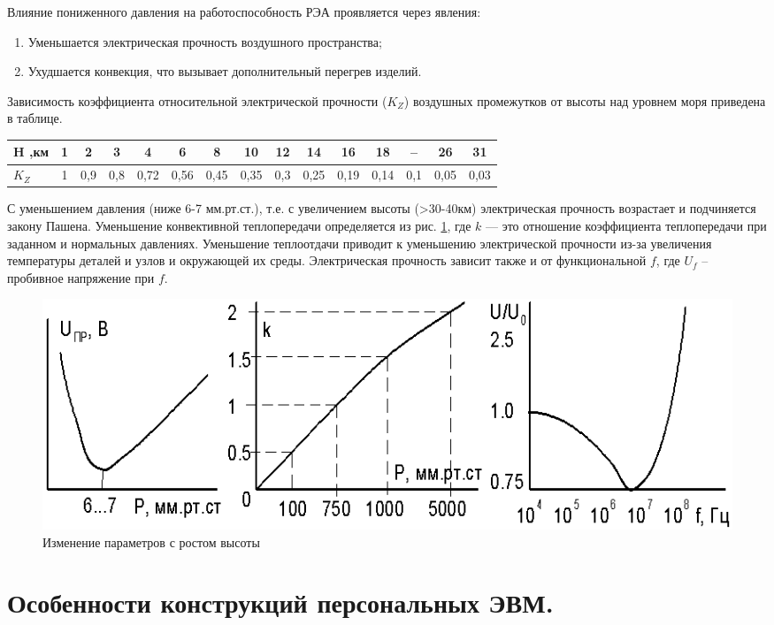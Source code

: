 \documentclass[unicode, 12pt, a4paper, oneside]{article}
\begin{document}
Влияние пониженного давления на работоспособность РЭА проявляется через явления:
\begin{enumerate}
\item Уменьшается электрическая прочность воздушного пространства;
\item Ухудшается конвекция, что вызывает дополнительный перегрев изделий.
\end{enumerate}

Зависимость коэффициента относительной электрической прочности ($ K_Z $) воздушных промежутков от высоты над уровнем моря приведена в таблице.
\begin{center}
\begin{tabular}{|l|c|c|c|c|c|c|c|c|c|c|c|c|c|c|}
\hline
H ,км 	& 1 & 2		& 3		& 4		& 6		& 8		& 10	& 12	& 14	& 16	& 18	& --	& 26	& 31	\\ \hline
$ K_Z $ & 1 & 0,9	& 0,8	& 0,72	& 0,56	& 0,45	& 0,35	& 0,3	& 0,25	& 0,19	& 0,14	& 0,1	& 0,05	& 0,03	\\ \hline
\end{tabular}
\end{center}

С уменьшением давления (ниже 6-7 мм.рт.ст.), т.е. с увеличением высоты (>30-40км) электрическая прочность возрастает и подчиняется закону Пашена. Уменьшение конвективной теплопередачи определяется из рис. \ref{fig:72_graphs}, где $ k $ --- это отношение коэффициента теплопередачи при заданном и нормальных давлениях. Уменьшение теплоотдачи приводит к уменьшению электрической прочности из-за увеличения температуры деталей и узлов и окружающей их среды. Электрическая прочность зависит также и от функциональной $ f $, где $ U_f $ – пробивное напряжение при $ f $.

\begin{figure}[H]
\centering
\includegraphics[width=0.8\linewidth]{72_graphs.png}
\caption{Изменение параметров с ростом высоты}\label{fig:72_graphs}
\end{figure}


\section{Особенности конструкций персональных ЭВМ.}
\end{document}
